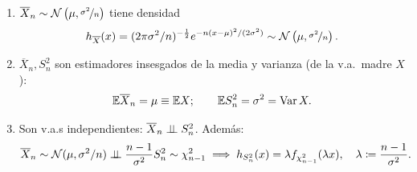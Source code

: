 {\begin{teorema}[1 — de Fisher]
\begin{enumerate}
  \item $\overline{X}_n \sim \mathcal{N}\left(\mu, \nicefrac{\sigma^2}{n}\right)$ tiene densidad
        \[
          h_{\overline{X}}(x) = (2\pi\sigma^2/n)^{-\frac{1}{2}} e^{-n(x-\mu)^2/(2\sigma^2)} \sim \mathcal{N}\left(\mu, \nicefrac{\sigma^2}{n}\right).
        \]
  \item $\overline{X}_n, S_n^2$ son estimadores insesgados de la media y varianza (de la v.a.\ madre $X$):
        \[
          \mathbb{E}\overline{X}_n = \mu \equiv \mathbb{E} X; \qquad \mathbb{E} S_n^2 = \sigma^2 = \operatorname{Var} X.
        \]
  \item Son v.a.s independientes: $\overline{X}_n \perp\!\!\!\perp S_n^2$. Además:
        \[
          \overline{X}_n \sim \mathcal{N}(\mu, \sigma^2/n) \perp\!\!\!\perp \frac{n-1}{\sigma^2}S_n^2 \sim \chi_{n-1}^2 \implies h_{S_n^2}(x) = \lambda f_{\chi_{n-1}^2}(\lambda x), \quad \lambda \coloneqq \frac{n-1}{\sigma^2}.
        \]
\end{enumerate}
\end{teorema}}
